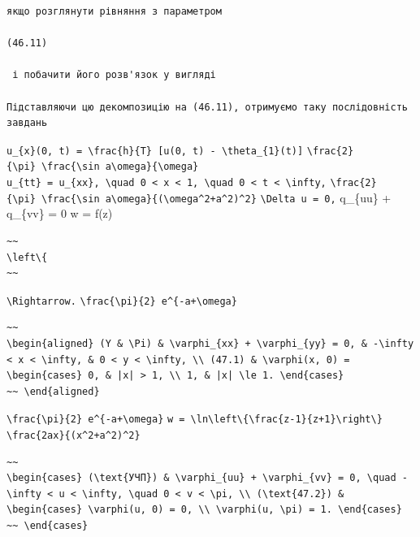 \documentclass[
  ukrainian,
]{article}
\begin{document}
\begin{verbatim}
якщо розглянути рівняння з параметром

(46.11)

 і побачити його розв'язок у вигляді

Підставляючи цю декомпозицію на (46.11), отримуємо таку послідовність завдань
\end{verbatim}

\texttt{u\_\{x\}(0,\ t)\ =\ \textbackslash{}frac\{h\}\{T\}\ {[}u(0,\ t)\ -\ \textbackslash{}theta\_\{1\}(t){]}}
\texttt{\textbackslash{}frac\{2\}\{\textbackslash{}pi\}\ \textbackslash{}frac\{\textbackslash{}sin\ a\textbackslash{}omega\}\{\textbackslash{}omega\}}
\texttt{u\_\{tt\}\ =\ u\_\{xx\},\ \textbackslash{}quad\ 0\ \textless{}\ x\ \textless{}\ 1,\ \textbackslash{}quad\ 0\ \textless{}\ t\ \textless{}\ \textbackslash{}infty,}
\texttt{\textbackslash{}frac\{2\}\{\textbackslash{}pi\}\ \textbackslash{}frac\{\textbackslash{}sin\ a\textbackslash{}omega\}\{(\textbackslash{}omega\^{}2+a\^{}2)\^{}2\}}
\texttt{\textbackslash{}Delta\ u\ =\ 0,} q\_\{uu\} + q\_\{vv\} = 0 w =
f(z)

\begin{verbatim}
~~
\left\{
~~
\end{verbatim}

\texttt{\textbackslash{}Rightarrow.}
\texttt{\textbackslash{}frac\{\textbackslash{}pi\}\{2\}\ e\^{}\{-a+\textbackslash{}omega\}}

\begin{verbatim}
~~
\begin{aligned} (Y & \Pi) & \varphi_{xx} + \varphi_{yy} = 0, & -\infty < x < \infty, & 0 < y < \infty, \\ (47.1) & \varphi(x, 0) = \begin{cases} 0, & |x| > 1, \\ 1, & |x| \le 1. \end{cases}
~~ \end{aligned}
\end{verbatim}

\texttt{\textbackslash{}frac\{\textbackslash{}pi\}\{2\}\ e\^{}\{-a+\textbackslash{}omega\}}
\texttt{w\ =\ \textbackslash{}ln\textbackslash{}left\textbackslash{}\{\textbackslash{}frac\{z-1\}\{z+1\}\textbackslash{}right\textbackslash{}\}}
\texttt{\textbackslash{}frac\{2ax\}\{(x\^{}2+a\^{}2)\^{}2\}}

\begin{verbatim}
~~
\begin{cases} (\text{УЧП}) & \varphi_{uu} + \varphi_{vv} = 0, \quad -\infty < u < \infty, \quad 0 < v < \pi, \\ (\text{47.2}) & \begin{cases} \varphi(u, 0) = 0, \\ \varphi(u, \pi) = 1. \end{cases}
~~ \end{cases}
\end{verbatim}
\end{document}

